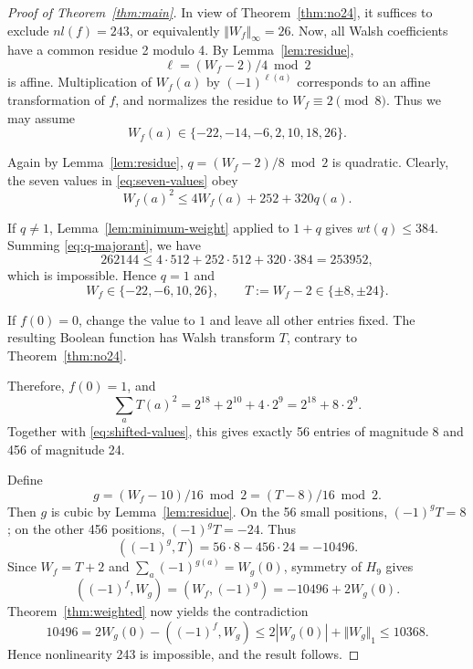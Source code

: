 \documentclass[11pt]{article}
\newtheorem{open problem}{Open problem}
\begin{document}
\begin{proof}[Proof of Theorem~\ref{thm:main}]
In view of Theorem~\ref{thm:no24}, it suffices to exclude $nl(f)=243$, or equivalently ${\Vert W_f\Vert }_{\infty}=26$. Now, all Walsh coefficients have a common residue 2 modulo 4. By Lemma~\ref{lem:residue},
\[
\ell=(W_f-2)/4\bmod2
\]
is affine. Multiplication of $W_f(a)$ by $(-1)^{\ell(a)}$ corresponds to an affine transformation of $f$, and normalizes the residue to $W_f\equiv2\pmod8$. Thus we may assume
\begin{equation}\label{eq:seven-values}
W_f(a)\in\{-22,-14,-6,2,10,18,26\}.
\end{equation}

Again by Lemma~\ref{lem:residue}, $q=(W_f-2)/8\bmod2$ is quadratic. Clearly, the seven values in \eqref{eq:seven-values} obey
\begin{equation}\label{eq:q-majorant}
W_f(a)^2\le4W_f(a)+252+320q(a).
\end{equation}

If $q\ne1$, Lemma~\ref{lem:minimum-weight} applied to $1+q$ gives $wt(q)\le384$. Summing \eqref{eq:q-majorant}, we have
\[
262144\le4\cdot512+252\cdot512+320\cdot384=253952,
\]
which is impossible. Hence $q=1$ and
\begin{equation}\label{eq:shifted-values}
W_f\in\{-22,-6,10,26\},\qquad
T:=W_f-2\in\{\pm8,\pm24\}.
\end{equation}

If $f(0)=0$, change the value to $1$ and leave all other entries fixed. The resulting Boolean function has Walsh transform $T$, contrary to Theorem~\ref{thm:no24}.

Therefore, $f(0)=1$, and
\begin{equation}\label{eq:T-energy}
\sum_aT(a)^2=2^{18}+2^{10}+4\cdot 2^9=2^{18}+8\cdot 2^9.
\end{equation}
Together with \eqref{eq:shifted-values}, this gives exactly 56 entries of magnitude 8 and 456 of magnitude 24.

Define
\begin{equation}\label{eq:g26}
g=(W_f-10)/16\bmod2=(T-8)/16\bmod2.
\end{equation}
Then $g$ is cubic by Lemma~\ref{lem:residue}. On the 56 small positions, $(-1)^gT=8$; on the other 456 positions, $(-1)^gT=-24$. Thus
\begin{equation}\label{eq:10496}
({(-1)^g},{T})=56\cdot 8-456\cdot 24=-10496.
\end{equation}
Since $W_f=T+2$ and $\sum_a(-1)^{g(a)}=W_g(0)$, symmetry of $H_9$ gives
\[
((-1)^f,W_g)=(W_f,(-1)^g)=-10496+2W_g(0).
\]
Theorem~\ref{thm:weighted} now yields the contradiction
\[
10496=2W_g(0)-((-1)^{f},{W_g})\le2|W_g(0)|+{\Vert W_g\Vert }_1\le10368.
\]
Hence nonlinearity 243 is impossible, and the result follows.
\end{proof}
\end{document}
